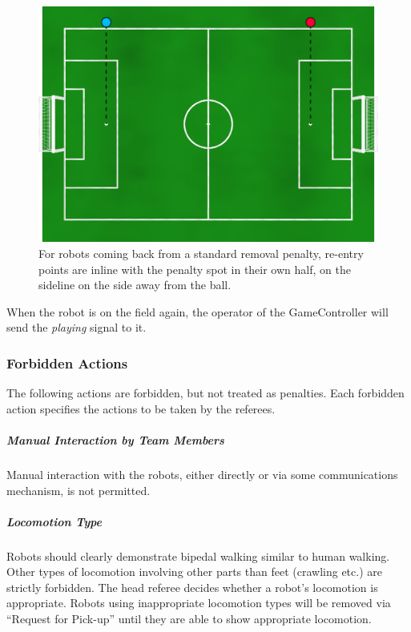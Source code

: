 \begin{figure}[t]
	\centerline{\includegraphics[width=\columnwidth]{figs/penalty_re-entry_points_2020.png}}
	\caption{For robots coming back from a standard removal penalty, re-entry points  are inline with the penalty spot in their own half, on the sideline on the side away from the ball.}
	\label{fig:penalty_re-entry_points}
\end{figure}

When the robot is on the field again, the operator of the GameController will send the \emph{playing} signal to it.

\subsubsection{Forbidden Actions}

The following actions are forbidden, but not treated as penalties.
Each forbidden action specifies the actions to be taken by the referees.

\subparagraph{Manual Interaction by Team Members}

Manual interaction with the robots, either directly or via some communications mechanism, is not permitted.

\subparagraph{Locomotion Type}
\label{sec:locomotion_type}

Robots should clearly demonstrate bipedal walking similar to human walking. Other types of locomotion involving other parts than feet (crawling etc.) are strictly forbidden.
The head referee decides whether a robot's locomotion is appropriate. Robots using inappropriate locomotion types will be removed via ``Request for Pick-up'' until they are able to show appropriate locomotion.

